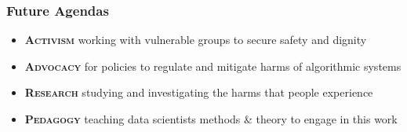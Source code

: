 \documentclass[main]{subfiles}
\begin{document}
\begin{frame}\frametitle{Future Agendas}

{
\begin{itemize}
  \item[] {\LARGE \bfseries \scshape Activism} working with vulnerable groups to secure safety and dignity

\vspace{2em}

  \item[] {\LARGE \bfseries \scshape Advocacy} for policies to regulate and mitigate harms of algorithmic systems

\vspace{2em}

  \item[] {\LARGE \bfseries \scshape Research} studying and investigating the harms that people experience

\vspace{2em}

  \item[] {\LARGE \bfseries \scshape Pedagogy} teaching data scientists methods \& theory to engage in this work
\end{itemize}
}






  




  

\end{frame}
\end{document}
